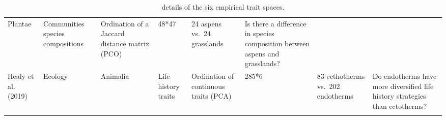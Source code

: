\documentclass[]{article}
\begin{document}
\begin{longtable}[]{@{}llllllll@{}}
\begin{minipage}[t]{0.14\columnwidth}
Plantae\strut
\end{minipage} & \begin{minipage}[t]{0.13\columnwidth}\raggedright\strut
Communities species compositions\strut
\end{minipage} & \begin{minipage}[t]{0.11\columnwidth}\raggedright\strut
Ordination of a Jaccard distance matrix (PCO)\strut
\end{minipage} & \begin{minipage}[t]{0.06\columnwidth}\raggedright\strut
48*47\strut
\end{minipage} & \begin{minipage}[t]{0.07\columnwidth}\raggedright\strut
24 aspens vs.~24 grasslands\strut
\end{minipage} & \begin{minipage}[t]{0.15\columnwidth}\raggedright\strut
Is there a difference in species composition between aspens and
grasslands?\strut
\end{minipage}\tabularnewline
\begin{minipage}[t]{0.06\columnwidth}\raggedright\strut
Healy et al. (2019)\strut
\end{minipage} & \begin{minipage}[t]{0.06\columnwidth}\raggedright\strut
Ecology\strut
\end{minipage} & \begin{minipage}[t]{0.14\columnwidth}\raggedright\strut
Animalia\strut
\end{minipage} & \begin{minipage}[t]{0.13\columnwidth}\raggedright\strut
Life history traits\strut
\end{minipage} & \begin{minipage}[t]{0.11\columnwidth}\raggedright\strut
Ordination of continuous traits (PCA)\strut
\end{minipage} & \begin{minipage}[t]{0.06\columnwidth}\raggedright\strut
285*6\strut
\end{minipage} & \begin{minipage}[t]{0.07\columnwidth}\raggedright\strut
83 ecthotherms vs.~202 endotherms\strut
\end{minipage} & \begin{minipage}[t]{0.15\columnwidth}\raggedright\strut
Do endotherms have more diversified life history strategies than
ectotherms?\strut
\end{minipage}\tabularnewline
\bottomrule
\caption{details of the six empirical trait spaces.}
\end{longtable}
\end{document}
